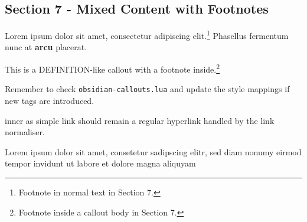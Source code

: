 \subsection{Section 7 - Mixed Content with
Footnotes}\label{inner-1-section-7---mixed-content-with-footnotes}

Lorem ipsum dolor sit amet, consectetur adipiscing elit.\footnote{Footnote
  in normal text in Section 7.} Phasellus fermentum nunc at
\textbf{arcu} placerat.

\begin{tcolorbox}[breakable,colback=ocPinBack,colframe=ocPinFrame,coltitle=ocPinTitle,left=3mm,boxed title style={left=1mm},title={\hspace*{-2.5mm}\iconDefinition\; Definition with footnote}]

This is a DEFINITION-like callout with a footnote inside.\footnote{Footnote
  inside a callout body in Section 7.}

\end{tcolorbox}

\begin{tcolorbox}[breakable,colback=yellow!5!white,colframe=yellow!50!black,left=3mm,boxed title style={left=1mm},title={\hspace*{-2.5mm}\iconTodo\; TODO with inline code}]

Remember to check \texttt{obsidian-callouts.lua} and update the style
mappings if new tags are introduced.

\end{tcolorbox}

inner as simple link should remain a regular hyperlink handled by the
link normaliser.

Lorem ipsum dolor sit amet, consetetur sadipscing elitr, sed diam nonumy
eirmod tempor invidunt ut labore et dolore magna aliquyam

